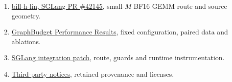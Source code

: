 \documentclass[11pt,a4paper]{article}
\begin{document}
\begin{enumerate}[leftmargin=1.6em,itemsep=.18em]
\item \href{https://github.com/sgl-project/sglang/pull/42145}{bill-h-lin, SGLang PR \#42145}, small-$M$ BF16 GEMM route and source geometry.
\item \href{https://github.com/yu830/graph-budget-runtime/blob/1f1984147608ee6c5dd8b3423e6f41877aaadeb4/docs/PERFORMANCE_RESULTS_20261027.md}{GraphBudget Performance Results}, fixed configuration, paired data and ablations.
\item \href{https://github.com/yu830/graph-budget-runtime/blob/1f1984147608ee6c5dd8b3423e6f41877aaadeb4/src/graphbudget/patches/sglang-v0.5.9.patch}{SGLang integration patch}, route, guards and runtime instrumentation.
\item \href{https://github.com/yu830/graph-budget-runtime/blob/1f1984147608ee6c5dd8b3423e6f41877aaadeb4/THIRD_PARTY_NOTICES.md}{Third-party notices}, retained provenance and licenses.
\end{enumerate}
\end{document}
